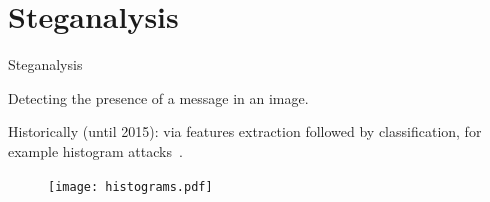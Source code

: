 \documentclass[10pt,aspectratio=169]{beamer}
\begin{document}

    


\section*{Steganalysis}

\begin{frame}{Steganalysis}

    \begin{center}
        \alert{Detecting the presence of a message in an image.}
    \end{center}

    \pause
    Historically (until 2015): via features extraction followed by classification, for example histogram attacks~.
    \begin{figure}
        \texttt{[image: histograms.pdf]}
    \end{figure}

\end{frame}
\end{document}
